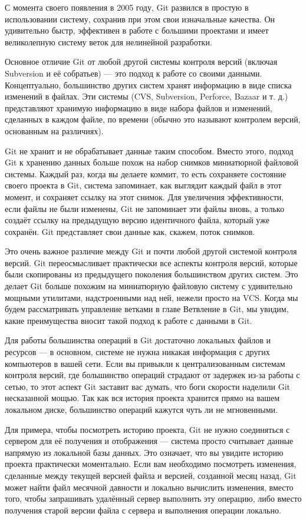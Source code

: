 С момента своего появления в 2005 году, Git развился в простую в использовании систему, сохранив при этом свои изначальные качества. Он удивительно быстр, эффективен в работе с большими проектами и имеет великолепную систему веток для нелинейной разработки.

Основное отличие Git от любой другой системы контроля версий (включая Subversion и её
собратьев) — это подход к работе со своими данными. Концептуально, большинство других
систем хранят информацию в виде списка изменений в файлах. Эти системы (CVS,
Subversion, Perforce, Bazaar и т. д.) представляют хранимую информацию в виде набора
файлов и изменений, сделанных в каждом файле, по времени (обычно это называют
контролем версий, основанным на различиях).

Git не хранит и не обрабатывает данные таким способом. Вместо этого, подход Git к
хранению данных больше похож на набор снимков миниатюрной файловой системы.
Каждый раз, когда вы делаете коммит, то есть сохраняете состояние своего проекта в Git, система запоминает, как выглядит каждый файл в этот момент, и сохраняет ссылку на этот снимок. Для увеличения эффективности, если файлы не были изменены, Git не запоминает эти файлы вновь, а только создаёт ссылку на предыдущую версию идентичного файла, который уже сохранён. Git представляет свои данные как, скажем, поток снимков.

Это очень важное различие между Git и почти любой другой системой контроля версий. Git переосмысливает практически все аспекты контроля версий, которые были скопированы
из предыдущего поколения большинством других систем. Это делает Git больше похожим
на миниатюрную файловую систему с удивительно мощными утилитами, надстроенными
над ней, нежели просто на VCS. Когда мы будем рассматривать управление ветками в главе Ветвление в Git, мы увидим, какие преимущества вносит такой подход к работе с данными в Git.

Для работы большинства операций в Git достаточно локальных файлов и ресурсов —  в основном, системе не нужна никакая информация с других компьютеров в вашей сети.
Если вы привыкли к централизованным системам контроля версий, где большинство
операций страдают от задержек из-за работы с сетью, то этот аспект Git заставит вас думать, что боги скорости наделили Git несказанной мощью. Так как вся история проекта хранится прямо на вашем локальном диске, большинство операций кажутся чуть ли не мгновенными.

Для примера, чтобы посмотреть историю проекта, Git не нужно соединяться с сервером для её получения и отображения — система просто считывает данные напрямую из локальной базы данных. Это означает, что вы увидите историю проекта практически моментально. Если вам необходимо посмотреть изменения, сделанные между текущей версией файла и версией, созданной месяц назад, Git может найти файл месячной давности и локально вычислить изменения, вместо того, чтобы запрашивать удалённый сервер выполнить эту операцию, либо вместо получения старой версии файла с сервера и выполнения операции локально.

